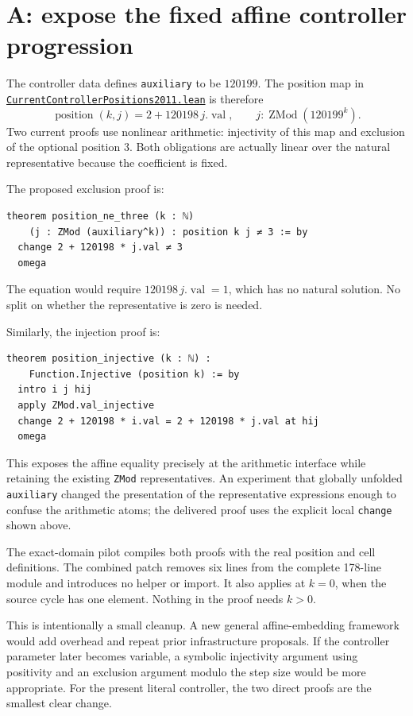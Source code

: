 \documentclass[11pt,letterpaper]{article}
\newcommand{\code}[1]{\nolinkurl{#1}}
\newcommand{\src}[2]{\href{https://github.com/VladimirReshetnikov/ProveIt/blob/9d9d1123b39927d30363f1dcd53c23f0575c30ee/Computability/DiophantineConsistency/Lean/DiophantineConsistency/#1.lean}{\code{#2}}}
\begin{document}
\section{A: expose the fixed affine controller progression}

The controller data defines \code{auxiliary} to be $120199$. The position map in
\src{CurrentControllerPositions2011}{CurrentControllerPositions2011.lean} is therefore
\[
 \operatorname{position}(k,j)=2+120198\,j.\operatorname{val},
 \qquad j:\operatorname{ZMod}(120199^k).
\]
Two current proofs use nonlinear arithmetic: injectivity of this map and exclusion of the optional position $3$. Both obligations are actually linear over the natural representative because the coefficient is fixed.

The proposed exclusion proof is:
\begin{lstlisting}
theorem position_ne_three (k : ℕ)
    (j : ZMod (auxiliary^k)) : position k j ≠ 3 := by
  change 2 + 120198 * j.val ≠ 3
  omega
\end{lstlisting}
The equation would require $120198\,j.\operatorname{val}=1$, which has no natural solution. No split on whether the representative is zero is needed.

Similarly, the injection proof is:
\begin{lstlisting}
theorem position_injective (k : ℕ) :
    Function.Injective (position k) := by
  intro i j hij
  apply ZMod.val_injective
  change 2 + 120198 * i.val = 2 + 120198 * j.val at hij
  omega
\end{lstlisting}
This exposes the affine equality precisely at the arithmetic interface while retaining the existing \code{ZMod} representatives. An experiment that globally unfolded \code{auxiliary} changed the presentation of the representative expressions enough to confuse the arithmetic atoms; the delivered proof uses the explicit local \code{change} shown above.

The exact-domain pilot compiles both proofs with the real position and cell definitions. The combined patch removes six lines from the complete 178-line module and introduces no helper or import. It also applies at $k=0$, when the source cycle has one element. Nothing in the proof needs $k>0$.

This is intentionally a small cleanup. A new general affine-embedding framework would add overhead and repeat prior infrastructure proposals. If the controller parameter later becomes variable, a symbolic injectivity argument using positivity and an exclusion argument modulo the step size would be more appropriate. For the present literal controller, the two direct proofs are the smallest clear change.
\end{document}
